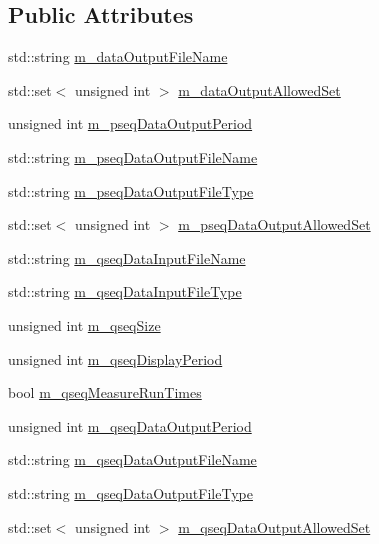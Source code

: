 \subsection*{Public Attributes}
\begin{DoxyCompactItemize}
\item 
std\-::string \hyperlink{class_q_u_e_s_o_1_1_mc_options_values_a67247424cb0b327fc1b4d6f067ce449c}{m\-\_\-data\-Output\-File\-Name}
\item 
std\-::set$<$ unsigned int $>$ \hyperlink{class_q_u_e_s_o_1_1_mc_options_values_acd7555643c1595e497ccc47bdfae8d55}{m\-\_\-data\-Output\-Allowed\-Set}
\item 
unsigned int \hyperlink{class_q_u_e_s_o_1_1_mc_options_values_a7e7f833d945cdfecac2000196fae1aa8}{m\-\_\-pseq\-Data\-Output\-Period}
\item 
std\-::string \hyperlink{class_q_u_e_s_o_1_1_mc_options_values_a8db3604c003959cb7ae7144a6bb37834}{m\-\_\-pseq\-Data\-Output\-File\-Name}
\item 
std\-::string \hyperlink{class_q_u_e_s_o_1_1_mc_options_values_a7409d101fbe0676f87754234567dbc33}{m\-\_\-pseq\-Data\-Output\-File\-Type}
\item 
std\-::set$<$ unsigned int $>$ \hyperlink{class_q_u_e_s_o_1_1_mc_options_values_a264ab755cc81477580ef59ad7ffcd7e7}{m\-\_\-pseq\-Data\-Output\-Allowed\-Set}
\item 
std\-::string \hyperlink{class_q_u_e_s_o_1_1_mc_options_values_aedf79873213bca688ebbf6d873f42e8e}{m\-\_\-qseq\-Data\-Input\-File\-Name}
\item 
std\-::string \hyperlink{class_q_u_e_s_o_1_1_mc_options_values_ac44d90277d7ba36d096ca5254614440d}{m\-\_\-qseq\-Data\-Input\-File\-Type}
\item 
unsigned int \hyperlink{class_q_u_e_s_o_1_1_mc_options_values_a54e8c4bb7d5ffa7755da7d148019c86e}{m\-\_\-qseq\-Size}
\item 
unsigned int \hyperlink{class_q_u_e_s_o_1_1_mc_options_values_a4ab5a0e5c5d3d47fa15516d98739ae25}{m\-\_\-qseq\-Display\-Period}
\item 
bool \hyperlink{class_q_u_e_s_o_1_1_mc_options_values_a4ae449bf66717fbb497b2cf42fb53923}{m\-\_\-qseq\-Measure\-Run\-Times}
\item 
unsigned int \hyperlink{class_q_u_e_s_o_1_1_mc_options_values_a8680e9d1886eb0a5d0e5b856b2471dfa}{m\-\_\-qseq\-Data\-Output\-Period}
\item 
std\-::string \hyperlink{class_q_u_e_s_o_1_1_mc_options_values_a1c2a61e5c129ba0c4c2455b75709feee}{m\-\_\-qseq\-Data\-Output\-File\-Name}
\item 
std\-::string \hyperlink{class_q_u_e_s_o_1_1_mc_options_values_a4816ea4c0aef22cc5d2e9057ea44b73e}{m\-\_\-qseq\-Data\-Output\-File\-Type}
\item 
std\-::set$<$ unsigned int $>$ \hyperlink{class_q_u_e_s_o_1_1_mc_options_values_a15671d02e2a6fa2052361dde6342e263}{m\-\_\-qseq\-Data\-Output\-Allowed\-Set}
\end{DoxyCompactItemize}
